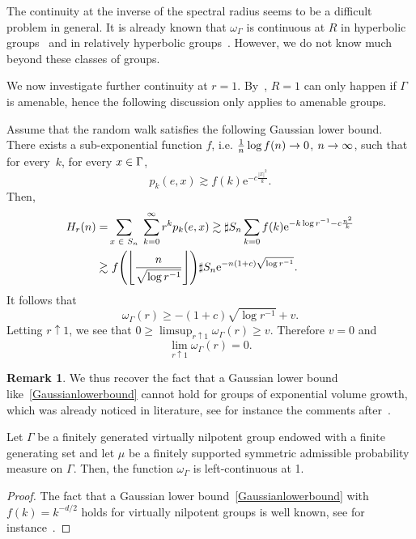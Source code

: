 \documentclass[10pt]{amsart}
\theoremstyle{definition}\newtheorem{defi}[theo]{Definition}\newtheorem{rema}[theo]{Remark}\newtheorem{exam}[theo]{Example}\newtheorem{exem}[theo]{Example}\newtheorem{nota}[theo]{Notation}
\newcommand{\rme}{\mathrm{e}}
\let\originalleft\left
\let\originalright\right
\renewcommand{\left}{\mathopen{}\mathclose\bgroup\originalleft}
\renewcommand{\right}{\aftergroup\egroup\originalright}
\let\oldin\in
\renewcommand{\in}{\mathchoice{\oldin}{\oldin}{\,\oldin\,}{\,\oldin\,}}
\renewcommand*{\to}{\mathchoice{\longrightarrow}{\rightarrow}{\rightarrow}{\rightarrow}}
\begin{document}
The continuity at the inverse of the spectral radius seems to be a difficult problem in general. It is already known that $\omega_\Gamma$ is continuous at $R$ in hyperbolic groups~\cite[Theorem~1.1]{SWX} and in relatively hyperbolic groups~\cite[Theorem~1.1]{DWY}. However, we do not know much beyond these classes of groups.


We now investigate further continuity at $r=1$. By~\cite[Theorem~12.5]{Woessbook}, $R=1$ can only happen if $\Gamma$ is amenable, hence the following discussion only applies to amenable groups.

Assume that the random walk satisfies the following Gaussian lower bound. There exists a sub-exponential function $f$, i.e. $\frac{1}{n}\log f(n)\to 0$, $n\to \infty$, such that for every~$k$, for every $x\in \Gamma$,
\begin{equation}\label{Gaussianlowerbound}
p_k(e, x) \gtrsim f(k) \rme^{- c \frac{|x|^2}{k}}.
\end{equation}
Then,
\begin{align*}
H_r(n) =& \sum_{x \in S_n}\;\sum_{k = 0}^{\infty} r^k p_k(e, x)
\gtrsim \sharp S_n \sum_{k = 0} f(k) \rme^{- k \log r^{-1} - c \frac{n^2}{k}} \\
\gtrsim & \ f\left(\left \lfloor \frac{n}{\sqrt{\log r^{-1}}} \right \rfloor \right)\sharp S_n \rme^{- n (1 + c) \sqrt{\log r^{-1}}}.
\end{align*}
It follows that
\[
\omega_{\Gamma}(r) \geq -(1 + c) \sqrt{\log r^{-1}} + v.
\]
Letting $r \uparrow 1$, we see that $0 \geq \limsup_{r \uparrow 1} \omega_{\Gamma}(r) \geq v$. Therefore $v = 0$ and
\[
\lim_{r \uparrow 1} \omega_{\Gamma}(r) = 0.
\]



\begin{rema}
We thus recover the fact that a Gaussian lower bound like~\eqref{Gaussianlowerbound} cannot hold for groups of exponential volume growth, which was already noticed in literature, see for instance the comments after~\cite[(0.3)]{Alexopoulospolycyclic}.
\end{rema}

\begin{prop}
Let $\Gamma$ be a finitely generated virtually nilpotent group endowed with a finite generating set and let $\mu$ be a finitely supported symmetric admissible probability measure on $\Gamma$. Then, the function $\omega_\Gamma$ is left-continuous at 1.
\end{prop}

\begin{proof}
The fact that a Gaussian lower bound~\eqref{Gaussianlowerbound} with $f(k)=k^{-d/2}$ holds for virtually nilpotent groups is well known, see for instance~\cite[Corollary~1.9]{Alexopoulos}.
\end{proof}
\end{document}
